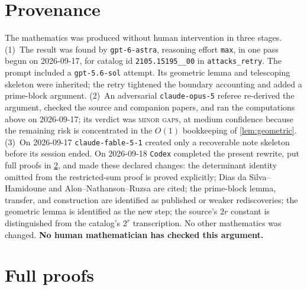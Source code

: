 \documentclass[11pt,a4paper]{article}
\theoremstyle{plain}
\theoremstyle{definition}
\theoremstyle{remark}
\begin{document}
\section{Provenance}\label{sec:provenance}
The mathematics was produced without human intervention in three stages.
(1)~The result was found by \texttt{gpt-6-astra}, reasoning effort
\texttt{max}, in one pass begun on 2026-09-17, for catalog id
\texttt{2105.15195\_\_00} in \texttt{attacks\_retry}. The prompt included
a \texttt{gpt-5.6-sol} attempt. Its geometric lemma and telescoping
skeleton were inherited; the retry tightened the boundary accounting and
added a prime-block argument.
(2)~An adversarial \texttt{claude-opus-5} referee re-derived the argument,
checked the source and companion papers, and ran the computations above
on 2026-09-17; its verdict was \textsc{minor gaps}, at medium confidence
because the remaining risk is concentrated in the $O(1)$ bookkeeping of
\cref{lem:geometric}.
(3)~On 2026-09-17 \texttt{claude-fable-5-1} created only a recoverable
note skeleton before its session ended. On 2026-09-18 \texttt{Codex}
completed the present rewrite, put full proofs in \cref{app:proofs}, and
made these declared changes:
the determinant identity omitted from the restricted-sum proof is proved
explicitly; Dias da Silva--Hamidoune and Alon--Nathanson--Ruzsa are cited;
the prime-block lemma, transfer, and construction are identified as
published or weaker rediscoveries; the geometric lemma is identified as
the new step; the source's $2r$ constant is distinguished from the
catalog's $2^r$ transcription. No other mathematics was changed.
\textbf{No human mathematician has checked this argument.}

\appendix
\section{Full proofs}\label{app:proofs}
\end{document}
